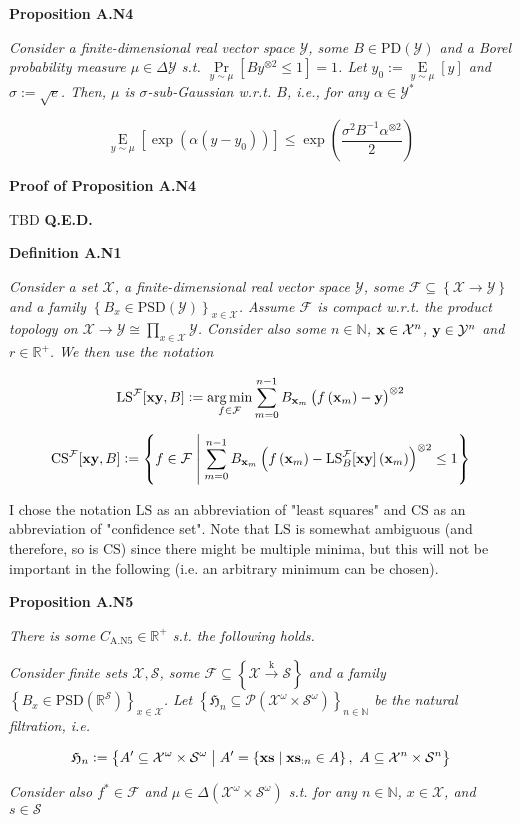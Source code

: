 \documentclass[a4paper]{article}
\newcommand{\Co}[1]{}
\newcommand{\AP}[1]{\left(#1\right)}
\newcommand{\AB}[1]{\left[#1\right]}
\newcommand{\AC}[1]{\left\{#1\right\}}
\newcommand{\ACM}[2]{\left\{#1\;\middle\vert\;#2\right\}}
\newcommand{\Pa}[2]{\underset{#1}{\operatorname{Pr}}\AB{#2}}
\newcommand{\Ea}[2]{\underset{#1}{\operatorname{E}}\AB{#2}}
\newcommand{\PS}[1]{\mathcal{P}\AP{#1}}
\newcommand{\Argmin}[1]{\underset{#1}{\operatorname{arg\,min}}\,}
\newcommand{\Nats}{\mathbb{N}}
\newcommand{\Reals}{\mathbb{R}}
\newcommand{\PD}{\mathrm{PD}}
\newcommand{\PSD}{\mathrm{PSD}}
\newcommand{\K}{\xrightarrow{\mathrm{k}}}
\newcommand{\B}{B}
\newcommand{\X}{\mathcal{X}}
\newcommand{\Y}{\mathcal{Y}}
\newcommand{\F}{\mathcal{F}}
\newcommand{\St}{\mathcal{S}}
\newcommand{\LS}{\mathrm{LS}}
\newcommand{\CS}{\mathrm{CS}}
\begin{document}
\textbf{Proposition A.N4}\Co{b}

\textit{Consider a finite-dimensional real vector space $\Y$, some $\B \in\PD(\Y)$ and a Borel probability measure $\mu\in\Delta\Y$ s.t. $\Pa{y\sim\mu}{\B y^{\otimes 2} \leq 1} = 1$. Let $y_0:=\Ea{y\sim\mu}{y}$ and $\sigma:=\sqrt{e}$. Then, $\mu$ is $\sigma$-sub-Gaussian w.r.t. $\B $, i.e., for any $\alpha\in\Y^*$}\Co{i}

$$\Ea{y\sim\mu}{\exp\AP{\alpha\AP{y-y_0}}} \leq \exp\AP{\frac{\sigma^2\B ^{-1}\alpha^{\otimes 2}}{2}}$$

\textbf{Proof of Proposition A.N4}\Co{b}

TBD \textbf{Q.E.D.}\Co{b}

\textbf{Definition A.N1}\Co{b}

\textit{Consider a set $\X$, a finite-dimensional real vector space $\Y$, some $\F\subseteq\AC{\X\rightarrow\Y}$ and a family $\AC{\B _x\in\PSD(\Y)}_{x\in\X}$. Assume $\F$ is compact w.r.t. the product topology on $\X\rightarrow\Y\cong\prod_{x\in\X}\Y$. Consider also some $n\in\Nats$, $\bold{x}\in\X^n$, $\bold{y}\in\Y^n$ and $r\in\Reals^+$. We then use the notation}\Co{i}

$$\LS^{\F}[\bold{xy},\B]:=\Argmin{f\in\F}{\sum_{m=0}^{n-1}\B _{\bold{x}_m}\AP{f\AP{\bold{x}_m}-\bold{y} }^{\otimes2}}$$

$$\CS^{\F}[\bold{xy},B]:=\ACM{f\in\F}{\sum_{m=0}^{n-1}\B _{\bold{x}_m}\AP{f\AP{\bold{x}_m}-\LS_\B ^\F[\bold{xy}]\AP{\bold{x}_m}}^{\otimes2}\leq 1}$$

I chose the notation $\LS$ as an abbreviation of "least squares" and $\CS$ as an abbreviation of "confidence set". Note that $\LS$ is somewhat ambiguous (and therefore, so is $\CS$) since there might be multiple minima, but this will not be important in the following (i.e. an arbitrary minimum can be chosen).

\textbf{Proposition A.N5}\Co{b}

\textit{There is some $C_{\mathrm{A.N5}}\in\Reals^+$ s.t. the following holds.}\Co{i}

\textit{Consider finite sets $\X,\St$, some $\F\subseteq\AC{\X\K\St}$ and a family $\AC{\B _x\in\PSD\AP{\Reals^\St}}_{x\in\X}$. Let $\AC{\mathfrak{H}_n\subseteq\PS{\X^\omega\times\St^\omega}}_{n\in\Nats}$ be the natural filtration, i.e.}\Co{i}

$$\mathfrak{H}_n:=\ACM{A'\subseteq\X^\omega\times\St^\omega}{A'=\ACM{\bold{xs}}{\bold{xs}_{:n}\in A},\ A\subseteq\X^n\times\St^n}$$

\textit{Consider also $f^*\in\F$ and $\mu\in\Delta\AP{\X^\omega\times\St^\omega}$ s.t. for any $n\in\Nats$, $x\in\X$, and $s\in\St$}\Co{i}
\end{document}
